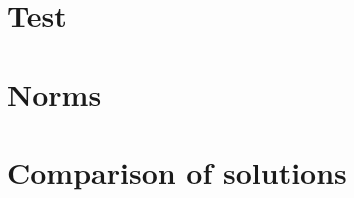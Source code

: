 \begin{appendix}
	\chapter{Test}\label{chp:appendix:test}
	\chapter{Norms} \label{chp:appendix:norms}
		
	\chapter{Comparison of solutions} \label{chp:appendix:comparison-of-solutions}
		
\end{appendix}